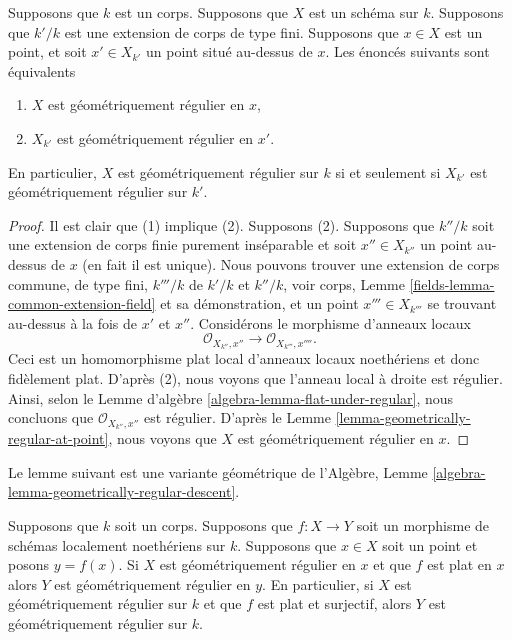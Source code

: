 \begin{lemma}
\label{lemma-geometrically-regular-upstairs}
Supposons que $k$ est un corps. Supposons que $X$ est
un schéma sur $k$. Supposons que $k'/k$ est une
extension de corps de type fini. Supposons que $x \in
X$ est un point, et soit $x' \in X_{k'}$ un point situé
au-dessus de $x$. Les énoncés suivants sont équivalents
\begin{enumerate}
\item $X$ est géométriquement régulier en $x$,
\item $X_{k'}$ est géométriquement régulier en $x'$.
\end{enumerate}
En particulier, $X$ est géométriquement régulier sur $k$ si et
seulement si $X_{k'}$ est géométriquement régulier sur $k'$.
\end{lemma}

\begin{proof}
Il est clair que (1) implique (2). Supposons (2). Supposons que
$k''/k$ soit une extension de corps finie purement inséparable
et soit $x'' \in X_{k''}$ un point au-dessus de $x$ (en fait il
est unique). Nous pouvons trouver une extension de corps
commune, de type fini, $k'''/k$ de $k'/k$ et $k''/k$, voir
corps, Lemme \ref{fields-lemma-common-extension-field} et sa
démonstration, et un point $x''' \in X_{k'''}$ se trouvant au-dessus
à la fois de $x'$ et $x''$. Considérons le morphisme d’anneaux locaux
$$
\mathcal{O}_{X_{k''}, x''} \longrightarrow \mathcal{O}_{X_{k'''}, x''''}.
$$
Ceci est un homomorphisme plat local d'anneaux locaux
noethériens et donc fidèlement plat. D'après (2), nous
voyons que l'anneau local à droite est régulier. Ainsi,
selon le Lemme d'algèbre
\ref{algebra-lemma-flat-under-regular}, nous concluons que
$\mathcal{O}_{X_{k''}, x''}$ est régulier. D'après le Lemme
\ref{lemma-geometrically-regular-at-point}, nous voyons que $X$ est géométriquement régulier en $x$.
\end{proof}

\noindent
Le lemme suivant est une variante géométrique de
l'Algèbre, Lemme \ref{algebra-lemma-geometrically-regular-descent}.

\begin{lemma}
\label{lemma-flat-under-geometrically-regular}
Supposons que $k$ soit un corps. Supposons que $f : X \to Y$
soit un morphisme de schémas localement noethériens sur $k$.
Supposons que $x \in X$ soit un point et posons $y = f(x)$. Si
$X$ est géométriquement régulier en $x$ et que $f$ est plat en
$x$ alors $Y$ est géométriquement régulier en $y$. En
particulier, si $X$ est géométriquement régulier sur $k$ et que $f$
est plat et surjectif, alors $Y$ est géométriquement régulier sur $k$.
\end{lemma}

